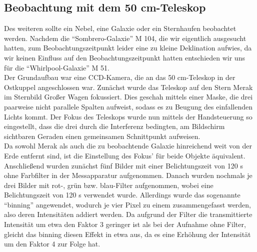 \subsection{Beobachtung mit dem 50 cm-Teleskop}
Des weiteren sollte ein Nebel, eine Galaxie oder ein Sternhaufen beobachtet werden. Nachdem die \enquote{Sombrero-Galaxie} M 104, die wir eigentlich ausgesucht hatten, zum Beobachtungszeitpunkt leider eine zu kleine Deklination aufwies, da wir keinen Einfluss auf den Beobachtungszeitpunkt hatten entschieden wir uns für die \enquote{Whirlpool-Galaxie} M 51. \\
Der Grundaufbau war eine CCD-Kamera, die an das 50 cm-Teleskop in der Ostkuppel angeschlossen war. 
Zunächst wurde das Teleskop auf den Stern Merak im Sternbild Großer Wagen fokussiert. Dies geschah mittels einer Maske, die drei paarweise nicht parallele Spalten aufweist, sodass es zu Beugung des einfallenden Lichts kommt. Der Fokus des Teleskops wurde nun mittels der Handsteuerung so eingestellt, dass die drei durch die Interferenz bedingten, am Bildschirm sichtbaren Geraden einen gemeinsamen Schnittpunkt aufweisen. \\
Da sowohl Merak als auch die zu beobachtende Galaxie hinreichend weit von der Erde entfernt sind, ist die Einstellung des Fokus' für beide Objekte äquivalent. \\
Anschließend wurden zunächst fünf Bilder mit einer Belichtungszeit von 120 s ohne Farbfilter in der Messapparatur aufgenommen. Danach wurden nochmals je drei Bilder mit rot-, grün bzw. blau-Filter aufgenommen, wobei eine Belichtungszeit von 120 s verwendet wurde. Allerdings wurde das sogenannte \enquote{binning} angewendet, wodurch je vier Pixel zu einem zusammengefasst werden, also deren Intensitäten addiert werden. Da aufgrund der Filter die transmittierte Intensität um etwa den Faktor 3 geringer ist als bei der Aufnahme ohne Filter, gleicht das binning diesen Effekt in etwa aus, da es eine Erhöhung der Intensität um den Faktor 4 zur Folge hat. 

